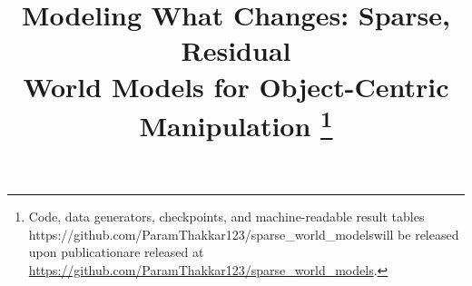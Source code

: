 \documentclass[conference]{IEEEtran}
\newif\ifanonymous
\begin{document}
%
%
\newcommand{\releaseurl}{https://github.com/ParamThakkar123/sparse_world_models}

\title{Modeling What Changes: Sparse, Residual\\ World Models for Object-Centric Manipulation
\thanks{Code, data generators, checkpoints, and machine-readable result tables
\ifx\releaseurl\empty will be released upon publication\else are released at
\url{\releaseurl}\fi.}}

\ifanonymous
  \author{\IEEEauthorblockN{Anonymous Author(s)}
  \IEEEauthorblockA{Submission under double-blind review}}
\else
  \author{
  \and
  \and
  }
\fi

\maketitle
\end{document}
